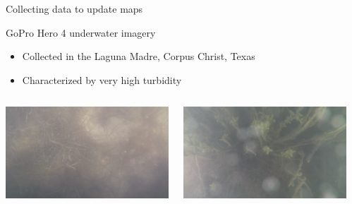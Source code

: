 \documentclass[9pt,xcolor=table]{beamer}
\begin{document}
\begin{frame}{Collecting data to update maps}
\begin{itemize}
    \end{itemize}
    \begin{block}{GoPro Hero 4 underwater imagery}
        \begin{itemize}
            \item Collected in the Laguna Madre, Corpus Christ, Texas
            \item Characterized by very high turbidity
        \end{itemize}
        \begin{columns}
            \begin{column}{0.33\textwidth}
            \includegraphics[width=\textwidth,trim={0cm 0cm 0cm 0cm},clip]{img/seagrass_field1_file2-00002.png}
            \end{column}
            \begin{column}{0.33\textwidth}
            \includegraphics[width=\textwidth,trim={0cm 0cm 0cm 0cm},clip]{img/seagrass_field2_file1-00039.png}
            \end{column}
            \begin{column}{0.33\textwidth}

\end{column}
\end{columns}
\end{block}
\end{frame}
\end{document}
